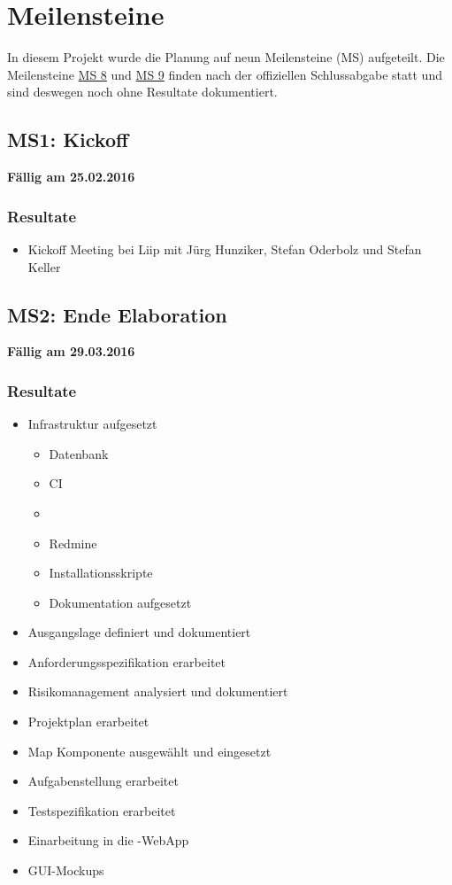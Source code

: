 \section{Meilensteine}
\label{pm-meilensteine}

In diesem Projekt wurde die Planung auf neun Meilensteine (MS) aufgeteilt. 
Die Meilensteine \hyperref[pm-ms8]{MS 8} und \hyperref[pm-ms9]{MS 9} finden nach der offiziellen Schlussabgabe statt und sind deswegen noch ohne Resultate dokumentiert.

\subsection{MS1: Kickoff}
\label{pm-ms1}
\textbf{Fällig am 25.02.2016}
\subsubsection{Resultate}
\begin{itemize}
	\item Kickoff Meeting bei Liip mit Jürg Hunziker, Stefan Oderbolz und Stefan Keller
\end{itemize}

\subsection{MS2: Ende Elaboration}
\label{pm-ms2}
\textbf{Fällig am 29.03.2016}
\subsubsection{Resultate}
\begin{itemize}
	\item Infrastruktur aufgesetzt
	\begin{itemize}
		\item Datenbank
		\item \gls{CI}
		\item {}
		\item Redmine
		\item Installationsskripte
		\item Dokumentation aufgesetzt
	\end{itemize}
	\item Ausgangslage definiert und dokumentiert
	\item Anforderungsspezifikation erarbeitet
	\item Risikomanagement analysiert und dokumentiert
	\item Projektplan erarbeitet
	\item Map Komponente ausgewählt und eingesetzt
	\item Aufgabenstellung erarbeitet
	\item Testspezifikation erarbeitet
	\item Einarbeitung in die \kort{}-\gls{WebApp}
	\item \gls{GUI}-Mockups
\end{itemize}

